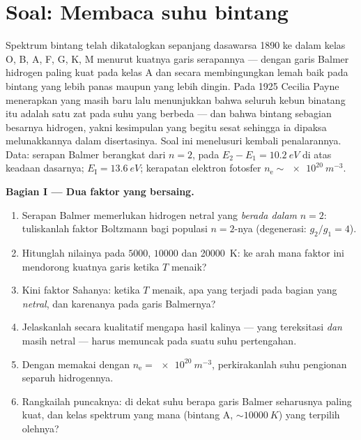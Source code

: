 \section{Soal: Membaca suhu bintang}

\begin{problem}\label{pb:b3:grand-canonical:1}
Spektrum bintang telah dikatalogkan sepanjang dasawarsa 1890 ke dalam
kelas O, B, A, F, G, K, M menurut kuatnya garis serapannya ---
dengan garis Balmer hidrogen paling kuat pada kelas A dan secara
membingungkan lemah baik pada bintang yang lebih panas maupun yang lebih
dingin. Pada 1925 Cecilia Payne menerapkan  yang masih
baru lalu menunjukkan bahwa seluruh kebun binatang itu adalah satu zat
pada suhu yang berbeda --- dan bahwa bintang sebagian besarnya hidrogen,
yakni kesimpulan yang begitu sesat sehingga ia dipaksa melunakkannya
dalam disertasinya. Soal ini menelusuri kembali penalarannya.
Data: serapan Balmer berangkat dari $n = 2$, pada $E_2 - E_1 =
\qty{10.2}{eV}$ di atas keadaan dasarnya; $E_{\text{I}} =
\qty{13.6}{eV}$; kerapatan elektron fotosfer $n_{\text{e}}
\sim \qty{e20}{m^{-3}}$.

\medskip\noindent\textbf{Bagian I --- Dua faktor yang bersaing.}
\begin{enumerate}
  \item Serapan Balmer memerlukan hidrogen netral yang \emph{berada
        dalam} $n =
        2$: tuliskanlah faktor Boltzmann bagi populasi $n = 2$-nya
        (degenerasi: $g_2/g_1 = 4$).
  \item Hitunglah nilainya pada $5000$, $10000$ dan \qty{20000}{K}: ke
        arah mana faktor ini mendorong kuatnya garis ketika $T$ menaik?
  \item Kini faktor Sahanya: ketika $T$ menaik, apa yang terjadi pada
        bagian yang \emph{netral}, dan karenanya pada garis Balmernya?
  \item Jelaskanlah secara kualitatif mengapa hasil kalinya --- yang
        tereksitasi \emph{dan} masih netral --- harus memuncak pada
        suatu suhu pertengahan.
  \item Dengan memakai  dengan $n_{\text{e}} =
        \qty{e20}{m^{-3}}$, perkirakanlah suhu pengionan separuh
        hidrogennya.
  \item Rangkailah puncaknya: di dekat suhu berapa garis Balmer
        seharusnya paling kuat, dan kelas spektrum yang mana
        (bintang A, $\sim\qty{10000}{K}$) yang terpilih olehnya?
\end{enumerate}


\end{problem}
